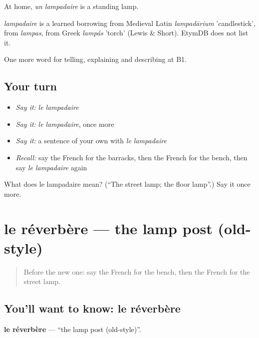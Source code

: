 At home, \emph{un lampadaire} is a standing lamp.

\begin{cousinweb}
\emph{lampadaire} is a learned borrowing from Medieval Latin \emph{lampadārium} 'candlestick', from \emph{lampas}, from Greek \emph{lampás} 'torch' (Lewis \& Short). EtymDB does not list it.
\end{cousinweb}

\begin{grammarlens}[title={What you've built}]
One more word for telling, explaining and describing at B1.
\end{grammarlens}

\subsection*{Your turn}
\begin{itemize}
\raggedright
  \item \emph{Say it:} \emph{le lampadaire}
  \item \emph{Say it:} \emph{le lampadaire}, once more
  \item \emph{Say it:} a sentence of your own with \emph{le lampadaire}
  \item \emph{Recall:} say the French for the barracks, then the French for the bench, then say \emph{le lampadaire} again
\end{itemize}

\begin{tcolorbox}[breakable,colback=teal!4,colframe=teal!35!black,title={Before you move on}]
What does le lampadaire mean? (\textquotedblleft{}The street lamp; the floor lamp\textquotedblright{}.) Say it once more.
\end{tcolorbox}
\section[le réverbère]{le réverbère — the lamp post (old-style)}

\label{lesson:FR-C441-reverbere}



\begin{quote}
Before the new one: say the French for the bench, then the French for the street lamp.
\end{quote}

\subsection*{You'll want to know: le réverbère}
\textbf{le réverbère} — \textquotedblleft{}the lamp post (old-style)\textquotedblright{}.

